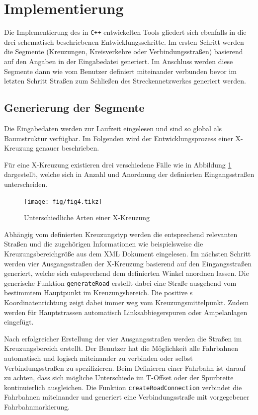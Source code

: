 \section{Implementierung}
Die Implementierung des in \texttt{C++} entwickelten Tools gliedert sich ebenfalls in die drei schematisch beschriebenen Entwicklungsschritte. Im ersten Schritt werden die Segmente (Kreuzungen, Kreisverkehre oder Verbindungsstraßen) basierend auf den Angaben in der Eingabedatei generiert. Im Anschluss werden diese Segmente dann wie vom Benutzer definiert miteinander verbunden bevor im letzten Schritt Straßen zum Schließen des Streckennetzwerkes generiert werden.

\subsection{Generierung der Segmente}
Die Eingabedaten werden zur Laufzeit eingelesen und sind so global als Baumstruktur verfügbar. Im Folgenden wird der Entwicklungsprozess einer X-Kreuzung genauer beschrieben.

Für eine X-Kreuzung existieren drei verschiedene Fälle wie in Abbildung \ref{abb4} dargestellt, welche sich in Anzahl und Anordnung der definierten Eingangsstraßen unterscheiden.

\begin{figure}[H]
\flushleft
\texttt{[image: fig/fig4.tikz]}
\caption{Unterschiedliche Arten einer X-Kreuzung}
\label{abb4}
\end{figure}

Abhängig vom definierten Kreuzungstyp werden die entsprechend relevanten Straßen und die zugehörigen Informationen wie beispielsweise die Kreuzungsbereichgröße aus dem XML Dokument eingelesen. Im nächsten Schritt werden vier Ausgangsstraßen der X-Kreuzung basierend auf den Eingangsstraßen generiert, welche sich entsprechend dem definierten Winkel anordnen lassen. Die generische Funktion \texttt{generateRoad} erstellt dabei eine Straße ausgehend vom bestimmtem Hauptpunkt im Kreuzungsbereich. Die positive s Koordinatenrichtung zeigt dabei immer weg vom Kreuzungsmittelpunkt. Zudem werden für Hauptstrassen automatisch Linksabbiegerspuren oder Ampelanlagen eingefügt.

Nach erfolgreicher Erstellung der vier Ausgangsstraßen werden die Straßen im Kreuzungsbereich erstellt. Der Benutzer hat die Möglichkeit alle Fahrbahnen automatisch und logisch miteinander zu verbinden oder selbst Verbindungsstraßen zu spezifizieren. Beim Definieren einer Fahrbahn ist darauf zu achten, dass sich mögliche Unterschiede im T-Offset oder der Spurbreite kontinuierlich ausgleichen. Die Funktion \texttt{createRoadConnection} verbindet die Fahrbahnen miteinander und generiert eine Verbindungsstraße mit vorgegebener Fahrbahnmarkierung.

